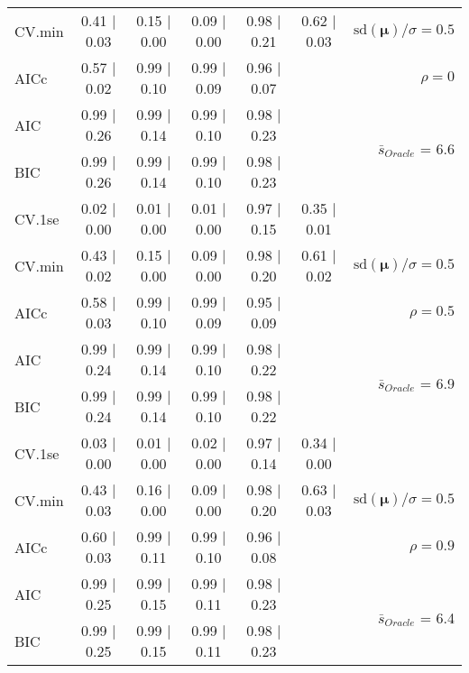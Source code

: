 \begin{table}
\begin{center}
\begin{tabular}{l*{5}{c}|r}
CV.min & 0.41 $\mid$ 0.03 & 0.15 $\mid$ 0.00 & 0.09 $\mid$ 0.00 & 0.98 $\mid$ 0.21 & 0.62 $\mid$ 0.03 &  $\mathrm{sd}(\mathbf{\mu})/\sigma=0.5$ \\
AICc & 0.57 $\mid$ 0.02 & 0.99 $\mid$ 0.10 & 0.99 $\mid$ 0.09 & 0.96 $\mid$ 0.07 & & $\rho=0$ \\
AIC & 0.99 $\mid$ 0.26 & 0.99 $\mid$ 0.14 & 0.99 $\mid$ 0.10 & 0.98 $\mid$ 0.23 & &  \multirow{2}{*}{$\bar{s}_{Oracle}$ = 6.6} \\
BIC & 0.99 $\mid$ 0.26 & 0.99 $\mid$ 0.14 & 0.99 $\mid$ 0.10 & 0.98 $\mid$ 0.23 & &  \\
 \hline 
CV.1se & 0.02 $\mid$ 0.00 & 0.01 $\mid$ 0.00 & 0.01 $\mid$ 0.00 & 0.97 $\mid$ 0.15 & 0.35 $\mid$ 0.01 & \\
CV.min & 0.43 $\mid$ 0.02 & 0.15 $\mid$ 0.00 & 0.09 $\mid$ 0.00 & 0.98 $\mid$ 0.20 & 0.61 $\mid$ 0.02 &  $\mathrm{sd}(\mathbf{\mu})/\sigma=0.5$ \\
AICc & 0.58 $\mid$ 0.03 & 0.99 $\mid$ 0.10 & 0.99 $\mid$ 0.09 & 0.95 $\mid$ 0.09 & & $\rho=0.5$ \\
AIC & 0.99 $\mid$ 0.24 & 0.99 $\mid$ 0.14 & 0.99 $\mid$ 0.10 & 0.98 $\mid$ 0.22 & &  \multirow{2}{*}{$\bar{s}_{Oracle}$ = 6.9} \\
BIC & 0.99 $\mid$ 0.24 & 0.99 $\mid$ 0.14 & 0.99 $\mid$ 0.10 & 0.98 $\mid$ 0.22 & &  \\
 \hline 
CV.1se & 0.03 $\mid$ 0.00 & 0.01 $\mid$ 0.00 & 0.02 $\mid$ 0.00 & 0.97 $\mid$ 0.14 & 0.34 $\mid$ 0.00 & \\
CV.min & 0.43 $\mid$ 0.03 & 0.16 $\mid$ 0.00 & 0.09 $\mid$ 0.00 & 0.98 $\mid$ 0.20 & 0.63 $\mid$ 0.03 &  $\mathrm{sd}(\mathbf{\mu})/\sigma=0.5$ \\
AICc & 0.60 $\mid$ 0.03 & 0.99 $\mid$ 0.11 & 0.99 $\mid$ 0.10 & 0.96 $\mid$ 0.08 & & $\rho=0.9$ \\
AIC & 0.99 $\mid$ 0.25 & 0.99 $\mid$ 0.15 & 0.99 $\mid$ 0.11 & 0.98 $\mid$ 0.23 & &  \multirow{2}{*}{$\bar{s}_{Oracle}$ = 6.4} \\
BIC & 0.99 $\mid$ 0.25 & 0.99 $\mid$ 0.15 & 0.99 $\mid$ 0.11 & 0.98 $\mid$ 0.23 & &  \\
 \hline 
\end{tabular}
\end{center}
\vspace{-1cm}
\end{table}




